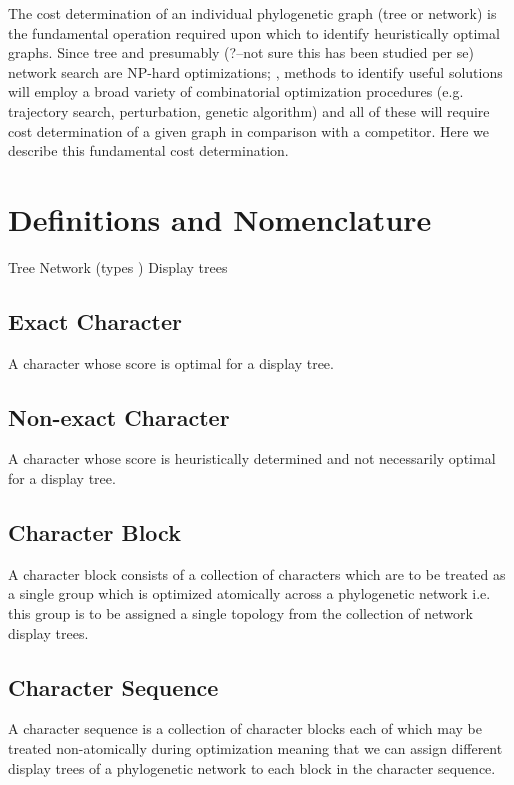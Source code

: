\documentclass[12pt]{article}
\begin{document}
The cost determination of an individual phylogenetic graph (tree or network) is the fundamental operation required upon which to identify heuristically optimal graphs.
Since tree and presumably (?--not sure this has been studied per se) network search are NP-hard optimizations; \citep{foulds1982, Day1987, Roch2006}, methods to identify useful solutions will employ a broad variety of combinatorial optimization procedures  (e.g. trajectory search, perturbation, genetic algorithm) and all of these will require cost determination of a given graph in comparison with a competitor.
Here we describe this fundamental cost determination.

\section{Definitions and Nomenclature}
Tree
Network (types )
Display trees

\subsection{Exact Character}

A character whose score is optimal for a display tree.

\subsection{Non-exact Character}

A character whose score is heuristically determined and not necessarily optimal for a display tree.

\subsection{Character Block}

A character block consists of a collection of characters which are to be treated as a single group which is optimized atomically across a phylogenetic network i.e. this group is to be assigned a single topology from the collection of network display trees.

\subsection{Character Sequence}

A character sequence is a collection of character blocks each of which may be treated non-atomically during optimization meaning that we can assign different display trees of a phylogenetic network to each block in the character sequence.
\end{document}
